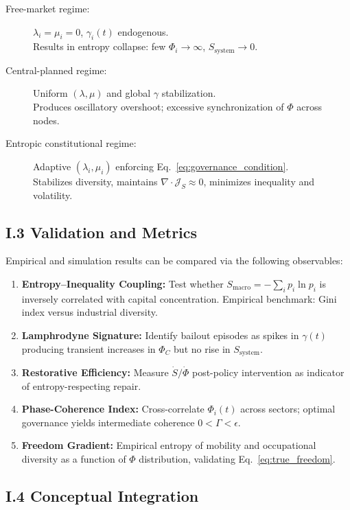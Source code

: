 \documentclass[11pt,a4paper,titlepage]{article}
\theoremstyle{definition}
\begin{document}
\begin{itemize}
\begin{description}
\item[Free-market regime:] $\lambda_i=\mu_i=0$, $\gamma_i(t)$ endogenous. \\
Results in entropy collapse: few $\Phi_i\!\rightarrow\!\infty$, $S_{\text{system}}\!\rightarrow\!0$.
\item[Central-planned regime:] Uniform $(\lambda,\mu)$ and global $\gamma$ stabilization. \\
Produces oscillatory overshoot; excessive synchronization of $\Phi$ across nodes.
\item[Entropic constitutional regime:] Adaptive $(\lambda_i,\mu_i)$ enforcing Eq.~\eqref{eq:governance_condition}. \\
Stabilizes diversity, maintains $\nabla\cdot\mathcal{J}_S\!\approx\!0$, minimizes inequality and volatility.
\end{description}

\subsection*{I.3 Validation and Metrics}

Empirical and simulation results can be compared via the following observables:

\begin{enumerate}
\item \textbf{Entropy–Inequality Coupling:}  
Test whether $S_{\text{macro}} = -\sum_i p_i\ln p_i$ is inversely correlated with capital concentration.  
Empirical benchmark: Gini index versus industrial diversity.
\item \textbf{Lamphrodyne Signature:}  
Identify bailout episodes as spikes in $\gamma(t)$ producing transient increases in $\Phi_C$ but no rise in $S_{\text{system}}$.
\item \textbf{Restorative Efficiency:}  
Measure $\dot S / \dot \Phi$ post-policy intervention as indicator of entropy-respecting repair.
\item \textbf{Phase-Coherence Index:}  
Cross-correlate $\Phi_i(t)$ across sectors; optimal governance yields intermediate coherence $0<\Gamma<\epsilon$.
\item \textbf{Freedom Gradient:}  
Empirical entropy of mobility and occupational diversity as a function of $\Phi$ distribution, validating Eq.~\eqref{eq:true_freedom}.
\end{enumerate}

\subsection*{I.4 Conceptual Integration}


\end{itemize}
\end{document}
